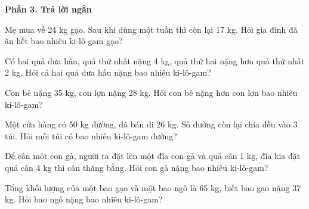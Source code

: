 \textbf{Phần 3. Trả lời ngắn}

\begin{ex} %
Mẹ mua về 24 kg gạo. Sau khi dùng một tuần thì còn lại 17 kg. Hỏi gia đình đã ăn hết bao nhiêu ki-lô-gam gạo?
\end{ex}

\begin{ex} %
Có hai quả dưa hấu, quả thứ nhất nặng 4 kg, quả thứ hai nặng hơn quả thứ nhất 2 kg. Hỏi cả hai quả dưa hấu nặng bao nhiêu ki-lô-gam?
\end{ex}

\begin{ex} %
Con bê nặng 35 kg, con lợn nặng 28 kg. Hỏi con bê nặng hơn con lợn bao nhiêu ki-lô-gam?
\end{ex}

\begin{ex} %
Một cửa hàng có 50 kg đường, đã bán đi 26 kg. Số đường còn lại chia đều vào 3 túi. Hỏi mỗi túi có bao nhiêu ki-lô-gam đường?
\end{ex}

\begin{ex} %
Để cân một con gà, người ta đặt lên một đĩa con gà và quả cân 1 kg, đĩa kia đặt quả cân 4 kg thì cân thăng bằng. Hỏi con gà nặng bao nhiêu ki-lô-gam?
\end{ex}

\begin{ex} %
Tổng khối lượng của một bao gạo và một bao ngô là 65 kg, biết bao gạo nặng 37 kg. Hỏi bao ngô nặng bao nhiêu ki-lô-gam?
\end{ex}
